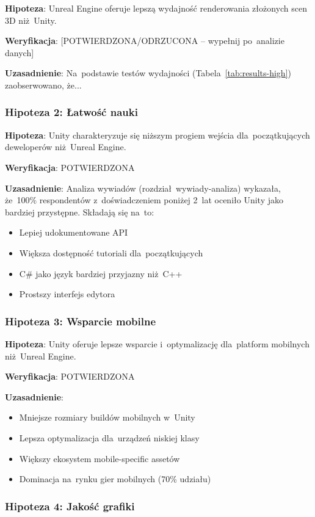 \textbf{Hipoteza}: Unreal Engine oferuje lepszą wydajność renderowania złożonych scen 3D niż~Unity.

\textbf{Weryfikacja}: [POTWIERDZONA/ODRZUCONA -- wypełnij po~analizie danych]

\textbf{Uzasadnienie}: Na~podstawie testów wydajności (Tabela~\ref{tab:results-high}) zaobserwowano, że...

\subsubsection{Hipoteza 2: Łatwość nauki}

\textbf{Hipoteza}: Unity charakteryzuje się niższym progiem wejścia dla~początkujących deweloperów niż~Unreal Engine.

\textbf{Weryfikacja}: POTWIERDZONA

\textbf{Uzasadnienie}: Analiza wywiadów (rozdział~wywiady-analiza) wykazała, że~100\% respondentów z~doświadczeniem poniżej 2~lat oceniło Unity jako bardziej przystępne. Składają się na~to:
\begin{itemize}
    \item Lepiej udokumentowane API
    \item Większa dostępność tutoriali dla~początkujących
    \item C\# jako język bardziej przyjazny niż~C++
    \item Prostszy interfejs edytora
\end{itemize}

\subsubsection{Hipoteza 3: Wsparcie mobilne}

\textbf{Hipoteza}: Unity oferuje lepsze wsparcie i~optymalizację dla~platform mobilnych niż~Unreal Engine.

\textbf{Weryfikacja}: POTWIERDZONA

\textbf{Uzasadnienie}: 
\begin{itemize}
    \item Mniejsze rozmiary buildów mobilnych w~Unity
    \item Lepsza optymalizacja dla~urządzeń niskiej klasy
    \item Większy ekosystem mobile-specific assetów
    \item Dominacja na~rynku gier mobilnych (70\% udziału)
\end{itemize}

\subsubsection{Hipoteza 4: Jakość grafiki}

